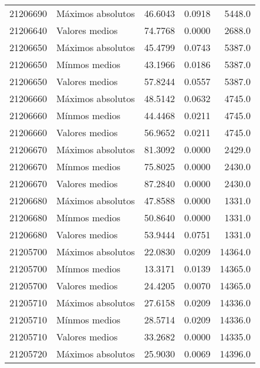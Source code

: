 \begin{longtable}{llrrr}
 21206690 &  Máximos absolutos &       46.6043 &         0.0918 &          5448.0 \\
 21206640 &     Valores medios &       74.7768 &         0.0000 &          2688.0 \\
 21206650 &  Máximos absolutos &       45.4799 &         0.0743 &          5387.0 \\
 21206650 &      Mínmos medios &       43.1966 &         0.0186 &          5387.0 \\
 21206650 &     Valores medios &       57.8244 &         0.0557 &          5387.0 \\
 21206660 &  Máximos absolutos &       48.5142 &         0.0632 &          4745.0 \\
 21206660 &      Mínmos medios &       44.4468 &         0.0211 &          4745.0 \\
 21206660 &     Valores medios &       56.9652 &         0.0211 &          4745.0 \\
 21206670 &  Máximos absolutos &       81.3092 &         0.0000 &          2429.0 \\
 21206670 &      Mínmos medios &       75.8025 &         0.0000 &          2430.0 \\
 21206670 &     Valores medios &       87.2840 &         0.0000 &          2430.0 \\
 21206680 &  Máximos absolutos &       47.8588 &         0.0000 &          1331.0 \\
 21206680 &      Mínmos medios &       50.8640 &         0.0000 &          1331.0 \\
 21206680 &     Valores medios &       53.9444 &         0.0751 &          1331.0 \\
 21205700 &  Máximos absolutos &       22.0830 &         0.0209 &         14364.0 \\
 21205700 &      Mínmos medios &       13.3171 &         0.0139 &         14365.0 \\
 21205700 &     Valores medios &       24.4205 &         0.0070 &         14365.0 \\
 21205710 &  Máximos absolutos &       27.6158 &         0.0209 &         14336.0 \\
 21205710 &      Mínmos medios &       28.5714 &         0.0209 &         14336.0 \\
 21205710 &     Valores medios &       33.2682 &         0.0000 &         14335.0 \\
 21205720 &  Máximos absolutos &       25.9030 &         0.0069 &         14396.0 \\

\end{longtable}
